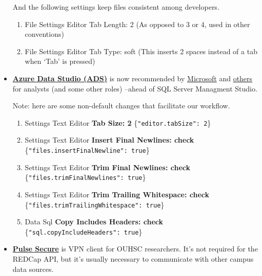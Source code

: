 \documentclass[
]{book}
\providecommand{\tightlist}{%
  \setlength{\itemsep}{0pt}\setlength{\parskip}{0pt}}
\begin{document}
\begin{itemize}
  And the following settings keep files consistent among developers.

  \begin{enumerate}
  \def\labelenumi{\arabic{enumi}.}
  \tightlist
  \item
    File \textbar{} Settings \textbar{} Editor \textbar{} Tab Length: 2 (As opposed to 3 or 4, used in other conventions)
  \item
    File \textbar{} Settings \textbar{} Editor \textbar{} Tab Type: soft (This inserts 2 spaces instead of a tab when `Tab' is pressed)
  \end{enumerate}
\item
  \textbf{\href{https://docs.microsoft.com/en-us/sql/azure-data-studio/download}{Azure Data Studio (ADS)}} is now recommended by \href{https://cloudblogs.microsoft.com/sqlserver/2018/09/25/azure-data-studio-for-sql-server/}{Microsoft} and \href{https://www.brentozar.com/archive/2019/04/if-you-work-with-sql-server-youre-really-lucky/}{others} for analysts (and some other roles) --ahead of SQL Server Managment Studio.

  Note: here are some non-default changes that facilitate our workflow.

  \begin{enumerate}
  \def\labelenumi{\arabic{enumi}.}
  \tightlist
  \item
    Settings \textbar{} Text Editor \textbar{} \textbf{Tab Size: 2} \{\texttt{"editor.tabSize":\ 2}\}
  \item
    Settings \textbar{} Text Editor \textbar{} \textbf{Insert Final Newlines: check} \{\texttt{"files.insertFinalNewline":\ true}\}
  \item
    Settings \textbar{} Text Editor \textbar{} \textbf{Trim Final Newlines: check} \{\texttt{"files.trimFinalNewlines":\ true}\}
  \item
    Settings \textbar{} Text Editor \textbar{} \textbf{Trim Trailing Whitespace: check} \{\texttt{"files.trimTrailingWhitespace":\ true}\}
  \item
    Data \textbar{} Sql \textbar{} \textbf{Copy Includes Headers: check} \{\texttt{"sql.copyIncludeHeaders":\ true}\}
  \end{enumerate}
\item
  \textbf{\href{https://connect.ouhsc.edu}{Pulse Secure}} is VPN client for OUHSC researchers. It's not required for the REDCap API, but it's usually necessary to communicate with other campus data sources.
\end{itemize}
\end{document}
